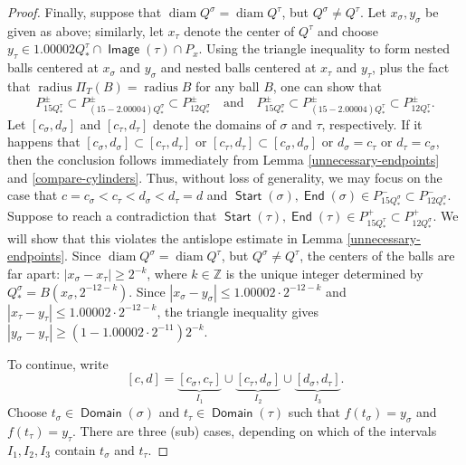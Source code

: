 \documentclass[12pt]{amsart}
\numberwithin{equation}{section}
\theoremstyle{plain}
\theoremstyle{definition}
\def\ZZ{\mathbb{Z}}
\newcommand{\radius}{\mathop\mathrm{radius}\nolimits}
\newcommand{\diam}{\mathop\mathrm{diam}\nolimits}
\newcommand{\Start}{\mathop\mathsf{Start}\nolimits}
\newcommand{\End}{\mathop\mathsf{End}\nolimits}
\newcommand{\Domain}{\mathop\mathsf{Domain}\nolimits}
\newcommand{\Image}{\mathop\mathsf{Image}\nolimits}
\numberwithin{figure}{section}
\begin{document}
\begin{proof}
Finally, suppose that $\diam Q^\sigma=\diam Q^\tau$, but $Q^\sigma\neq Q^\tau$. Let $x_\sigma,y_\sigma$ be given as above; similarly, let $x_\tau$ denote the center of $Q^\tau$ and choose $y_\tau\in 1.00002Q^\tau_*\cap \Image(\tau)\cap P_x$. Using the triangle inequality to form nested balls centered at $x_\sigma$ and $y_\sigma$ and nested balls centered at $x_\tau$ and $y_\tau$, plus the fact that $\radius \Pi_T(B)=\radius B$ for any ball $B$, one can show that \begin{equation}\label{compare-cylinders} P_{15Q^\tau_*}^\pm\subset P_{(15-2.00004)Q^\sigma_*}^\pm\subset P_{12Q^\sigma_*}^\pm\quad\text{and}\quad P_{15Q^\sigma_*}^\pm\subset P_{(15-2.00004)Q^\tau_*}^\pm\subset P_{12 Q^\tau_*}^\pm.\end{equation} Let $[c_\sigma,d_\sigma]$ and $[c_\tau,d_\tau]$ denote the domains of $\sigma$ and $\tau$, respectively. If it happens that $[c_\sigma,d_\sigma]\subset [c_\tau,d_\tau]$ or $[c_\tau,d_\tau]\subset [c_\sigma,d_\sigma]$ or $d_\sigma=c_\tau$ or $d_\tau=c_\sigma$, then the conclusion follows immediately from Lemma \ref{unnecessary-endpoints} and \eqref{compare-cylinders}. Thus, without loss of generality, we may focus on the case that $c=c_\sigma<c_\tau<d_\sigma<d_\tau=d$ and $\Start(\sigma),\End(\sigma)\in P_{15Q^\sigma_*}^-\subset P_{12Q^\sigma_*}^-$. Suppose to reach a contradiction that $\Start(\tau),\End(\tau)\in P_{15Q^\tau_*}^+\subset P_{12Q^\sigma_*}^+$. We will show that this violates the antislope estimate in Lemma \ref{unnecessary-endpoints}. Since $\diam Q^\sigma=\diam Q^\tau$, but $Q^\sigma\neq Q^\tau$, the centers of the balls are far apart: $|x_\sigma-x_\tau|\geq 2^{-k}$, where $k\in\ZZ$ is the unique integer determined by $Q^\sigma_*=B(x_\sigma, 2^{-12-k})$. Since $|x_\sigma-y_\sigma|\leq 1.00002\cdot 2^{-12-k}$ and $|x_\tau-y_\tau|\leq 1.00002\cdot 2^{-12-k}$, the triangle inequality gives $|y_\sigma-y_\tau| \geq (1-1.00002\cdot 2^{-11})2^{-k}$.

To continue, write $$[c,d]=\underbrace{[c_\sigma,c_\tau]}_{I_1}\cup\underbrace{[c_\tau,d_\sigma]}_{I_2}\cup\underbrace{[d_\sigma,d_\tau]}_{I_3}.$$ Choose $t_\sigma\in\Domain(\sigma)$ and $t_\tau\in\Domain(\tau)$ such that $f(t_\sigma)=y_\sigma$ and $f(t_\tau)=y_\tau$. There are three (sub) cases, depending on which of the intervals $I_1,I_2,I_3$ contain $t_\sigma$ and $t_\tau$.


\end{proof}
\end{document}
